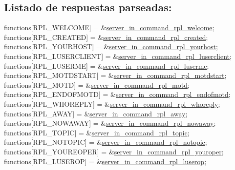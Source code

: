 \subsection*{Listado de respuestas parseadas\+:}


\begin{DoxyCode}
functions[RPL\_WELCOME]      = &\hyperlink{G-2313-06-P2__client__function__handlers_8h_a294ef5e5070e9859d88beb603ef950f2}{server\_in\_command\_rpl\_welcome};
functions[RPL\_CREATED]      = &\hyperlink{G-2313-06-P2__client__function__handlers_8h_a40e46db4017fb76fc547536d9c51f5d9}{server\_in\_command\_rpl\_created};
functions[RPL\_YOURHOST]     = &\hyperlink{G-2313-06-P2__client__function__handlers_8h_a3f4cf6c0d74b06a0916f7a9619972eee}{server\_in\_command\_rpl\_yourhost};
functions[RPL\_LUSERCLIENT]  = &\hyperlink{G-2313-06-P2__client__function__handlers_8h_af5091cf59cbab7ce259c405c019fa8dd}{server\_in\_command\_rpl\_luserclient};
functions[RPL\_LUSERME]      = &\hyperlink{G-2313-06-P2__client__function__handlers_8h_a5764225aa28906c7ccebf0996b2c5a08}{server\_in\_command\_rpl\_luserme};
functions[RPL\_MOTDSTART]    = &\hyperlink{G-2313-06-P2__client__function__handlers_8h_acd688f18855dcb6ee9bf10a72e0c8f6c}{server\_in\_command\_rpl\_motdstart};
functions[RPL\_MOTD]         = &\hyperlink{G-2313-06-P2__client__function__handlers_8h_a774c98f4ea94eb6f92a5b22d33030674}{server\_in\_command\_rpl\_motd};
functions[RPL\_ENDOFMOTD]    = &\hyperlink{G-2313-06-P2__client__function__handlers_8h_ad22233e08c30cad9e0598f80b5b38744}{server\_in\_command\_rpl\_endofmotd};
functions[RPL\_WHOREPLY]     = &\hyperlink{G-2313-06-P2__client__function__handlers_8h_a86782df5d9b151dd061b9831a47a2c5f}{server\_in\_command\_rpl\_whoreply};
functions[RPL\_AWAY]         = &\hyperlink{G-2313-06-P2__client__function__handlers_8h_add282510a7e92a90d45091e6dc3a3488}{server\_in\_command\_rpl\_away};
functions[RPL\_NOWAWAY]      = &\hyperlink{G-2313-06-P2__client__function__handlers_8h_ada377e1754f9a22a2ebe0bada8838b5b}{server\_in\_command\_rpl\_nowaway};
functions[RPL\_TOPIC]        = &\hyperlink{G-2313-06-P2__client__function__handlers_8h_abc030e3bc9ce4ad126ea2c66e304e2d5}{server\_in\_command\_rpl\_topic};
functions[RPL\_NOTOPIC]      = &\hyperlink{G-2313-06-P2__client__function__handlers_8h_ab9b55bd1e18bde61e8327fcf6936d91f}{server\_in\_command\_rpl\_notopic};
functions[RPL\_YOUREOPER]    = &\hyperlink{G-2313-06-P2__client__function__handlers_8h_a24bb76a5941798964a8dd18e1cfb1d81}{server\_in\_command\_rpl\_youroper};
functions[RPL\_LUSEROP]      = &\hyperlink{G-2313-06-P2__client__function__handlers_8h_aa885b5d729d8a920a1c38678abdbe6b7}{server\_in\_command\_rpl\_luserop};

\end{DoxyCode}
